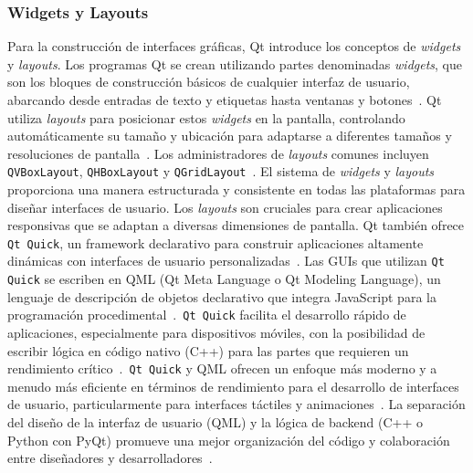 \subsubsection{Widgets y Layouts}
Para la construcción de interfaces gráficas, Qt introduce los conceptos de \textit{widgets} y \textit{layouts}. Los programas Qt se crean utilizando partes denominadas \textit{widgets}, que son los bloques de construcción básicos de cualquier interfaz de usuario, abarcando desde entradas de texto y etiquetas hasta ventanas y botones~\cite{businesscloud}. Qt utiliza \textit{layouts} para posicionar estos \textit{widgets} en la pantalla, controlando automáticamente su tamaño y ubicación para adaptarse a diferentes tamaños y resoluciones de pantalla~\cite{businesscloud}. Los administradores de \textit{layouts} comunes incluyen \texttt{QVBoxLayout}, \texttt{QHBoxLayout} y \texttt{QGridLayout}~\cite{tutorialspoint_pyqt}. El sistema de \textit{widgets} y \textit{layouts} proporciona una manera estructurada y consistente en todas las plataformas para diseñar interfaces de usuario. Los \textit{layouts} son cruciales para crear aplicaciones responsivas que se adaptan a diversas dimensiones de pantalla.
Qt también ofrece \texttt{Qt Quick}, un framework declarativo para construir aplicaciones altamente dinámicas con interfaces de usuario personalizadas~\cite{qt_wiki}. Las GUIs que utilizan \texttt{Qt Quick} se escriben en QML (Qt Meta Language o Qt Modeling Language), un lenguaje de descripción de objetos declarativo que integra JavaScript para la programación procedimental~\cite{qt_wiki}.\ \texttt{Qt Quick} facilita el desarrollo rápido de aplicaciones, especialmente para dispositivos móviles, con la posibilidad de escribir lógica en código nativo (C++) para las partes que requieren un rendimiento crítico~\cite{qt_wiki}.\ \texttt{Qt Quick} y QML ofrecen un enfoque más moderno y a menudo más eficiente en términos de rendimiento para el desarrollo de interfaces de usuario, particularmente para interfaces táctiles y animaciones~\cite{qt_for_python}. La separación del diseño de la interfaz de usuario (QML) y la lógica de backend (C++ o Python con PyQt) promueve una mejor organización del código y colaboración entre diseñadores y desarrolladores~\cite{qt_framework}.

